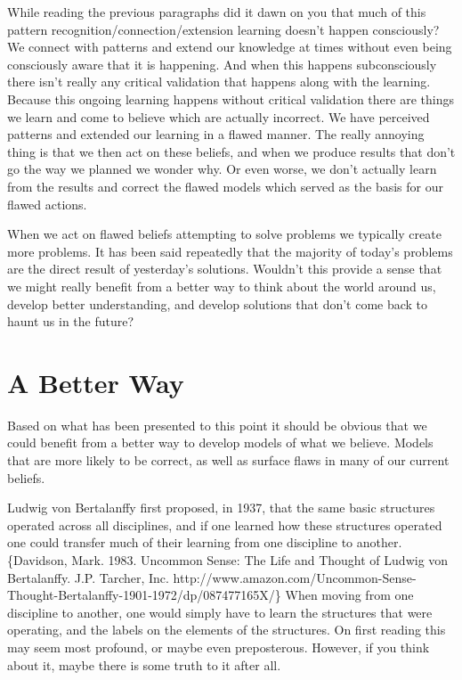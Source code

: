 \documentclass[]{memoir}
\begin{document}
While reading the previous paragraphs did it dawn on you that much of
this pattern recognition/connection/extension learning doesn't happen
consciously? We connect with patterns and extend our knowledge at times
without even being consciously aware that it is happening. And when this
happens subconsciously there isn't really any critical validation that
happens along with the learning. Because this ongoing learning happens
without critical validation there are things we learn and come to
believe which are actually incorrect. We have perceived patterns and
extended our learning in a flawed manner. The really annoying thing is
that we then act on these beliefs, and when we produce results that
don't go the way we planned we wonder why. Or even worse, we don't
actually learn from the results and correct the flawed models which
served as the basis for our flawed actions.

When we act on flawed beliefs attempting to solve problems we typically
create more problems. It has been said repeatedly that the majority of
today's problems are the direct result of yesterday's solutions.
Wouldn't this provide a sense that we might really benefit from a better
way to think about the world around us, develop better understanding,
and develop solutions that don't come back to haunt us in the future?

\section{A Better Way}

Based on what has been presented to this point it should be obvious that
we could benefit from a better way to develop models of what we believe.
Models that are more likely to be correct, as well as surface flaws in
many of our current beliefs.

Ludwig von Bertalanffy first proposed, in 1937, that the same basic
structures operated across all disciplines, and if one learned how these
structures operated one could transfer much of their learning from one
discipline to another.\{Davidson, Mark. 1983. Uncommon Sense: The Life
and Thought of Ludwig von Bertalanffy. J.P. Tarcher, Inc.
http://www.amazon.com/Uncommon-Sense-Thought-Bertalanffy-1901-1972/dp/087477165X/\}
When moving from one discipline to another, one would simply have to
learn the structures that were operating, and the labels on the elements
of the structures. On first reading this may seem most profound, or
maybe even preposterous. However, if you think about it, maybe there is
some truth to it after all.
\end{document}

